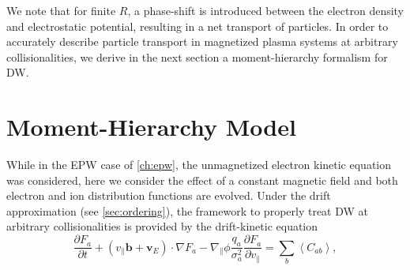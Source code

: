 We note that for finite $R$, a phase-shift is introduced between the electron density and electrostatic potential, resulting in a net transport of particles.
%
In order to accurately describe particle transport in magnetized plasma systems at arbitrary collisionalities, we derive in the next section a moment-hierarchy formalism for DW.

\section{Moment-Hierarchy Model}
\label{sec:momhierarchymodeldw}

While in the EPW case of \cref{ch:epw}, the unmagnetized electron kinetic equation was considered, here we consider the effect of a constant magnetic field and both electron and ion distribution functions are evolved.
%
Under the drift approximation (see \cref{sec:ordering}), the framework to properly treat DW at arbitrary collisionalities is provided by the drift-kinetic equation
%
\begin{equation}
    \frac{\partial F_a}{\partial t} +  \left(v_\parallel \mathbf b + \mathbf v_{E}\right) \cdot \nabla F_a-\nabla_\parallel \phi \frac{q_a}{\sigma_a^2} \frac{\partial F_a}{\partial v_\parallel}= \sum_b \left<C_{ab}\right>,
    \label{eq:dk}
\end{equation}

